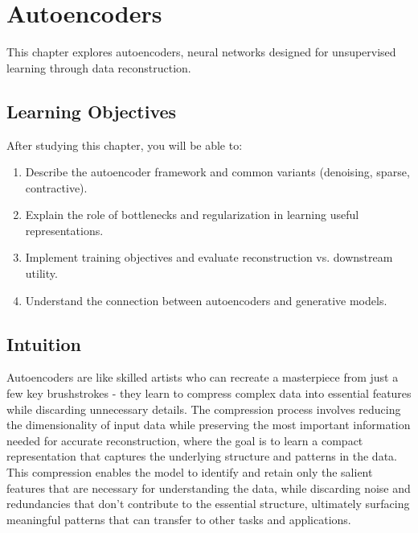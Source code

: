 
\chapter{Autoencoders}
\label{chap:autoencoders}

This chapter explores autoencoders, neural networks designed for unsupervised learning through data reconstruction.


\section*{Learning Objectives}

After studying this chapter, you will be able to:

\begin{enumerate}
    \item Describe the autoencoder framework and common variants (denoising, sparse, contractive).
    \item Explain the role of bottlenecks and regularization in learning useful representations.
    \item Implement training objectives and evaluate reconstruction vs. downstream utility.
    \item Understand the connection between autoencoders and generative models.
\end{enumerate}



\section*{Intuition}

Autoencoders are like skilled artists who can recreate a masterpiece from just a few key brushstrokes - they learn to compress complex data into essential features while discarding unnecessary details. The compression process involves reducing the dimensionality of input data while preserving the most important information needed for accurate reconstruction, where the goal is to learn a compact representation that captures the underlying structure and patterns in the data. This compression enables the model to identify and retain only the salient features that are necessary for understanding the data, while discarding noise and redundancies that don't contribute to the essential structure, ultimately surfacing meaningful patterns that can transfer to other tasks and applications.












